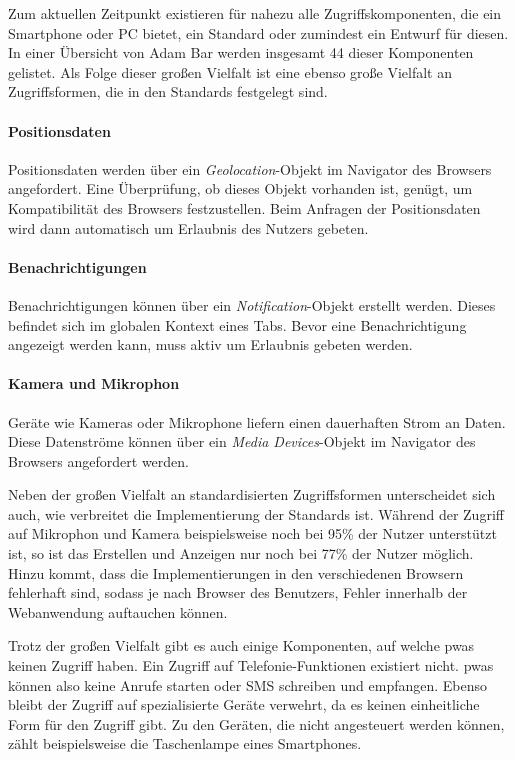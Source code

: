 \documentclass[12pt, parskip=half]{scrartcl}       %
\begin{document}
Zum aktuellen Zeitpunkt existieren für nahezu alle Zugriffskomponenten, die ein Smartphone oder PC bietet, ein Standard oder zumindest ein Entwurf für diesen.
In einer Übersicht von Adam Bar\cite{bar_webcando} werden insgesamt 44 dieser Komponenten gelistet.
Als Folge dieser großen Vielfalt ist eine ebenso große Vielfalt an Zugriffsformen, die in den Standards festgelegt sind.

\paragraph{Positionsdaten} Positionsdaten werden über ein \textit{Geolocation}-Objekt im Navigator des Browsers angefordert.
Eine Überprüfung, ob dieses Objekt vorhanden ist, genügt, um Kompatibilität des Browsers festzustellen.
Beim Anfragen der Positionsdaten wird dann automatisch um Erlaubnis des Nutzers gebeten\cite{w3c_geolocation}.

\paragraph{Benachrichtigungen} Benachrichtigungen können über ein \textit{Notification}-Objekt erstellt werden. Dieses befindet sich im globalen Kontext eines Tabs.
Bevor eine Benachrichtigung angezeigt werden kann, muss aktiv um Erlaubnis gebeten werden\cite{whatwg_notification}.

\paragraph{Kamera und Mikrophon} Geräte wie Kameras oder Mikrophone liefern einen dauerhaften Strom an Daten.
Diese Datenströme können über ein \textit{Media Devices}-Objekt im Navigator des Browsers angefordert werden\cite{w3c_mediacapture}.

Neben der großen Vielfalt an standardisierten Zugriffsformen unterscheidet sich auch, wie verbreitet die Implementierung der Standards ist.
Während der Zugriff auf Mikrophon und Kamera beispielsweise noch bei 95\% der Nutzer unterstützt ist, so ist das Erstellen und Anzeigen nur noch bei 77\% der Nutzer möglich\cite{caniuse}.
Hinzu kommt, dass die Implementierungen in den verschiedenen Browsern fehlerhaft sind, sodass je nach Browser des Benutzers, Fehler innerhalb der Webanwendung auftauchen können.

Trotz der großen Vielfalt gibt es auch einige Komponenten, auf welche \acp{pwa} keinen Zugriff haben.
Ein Zugriff auf Telefonie-Funktionen existiert nicht.
\acp{pwa} können also keine Anrufe starten oder SMS schreiben und empfangen.
Ebenso bleibt der Zugriff auf spezialisierte Geräte verwehrt, da es keinen einheitliche Form für den Zugriff gibt.
Zu den Geräten, die nicht angesteuert werden können, zählt beispielsweise die Taschenlampe eines Smartphones.
\end{document}
